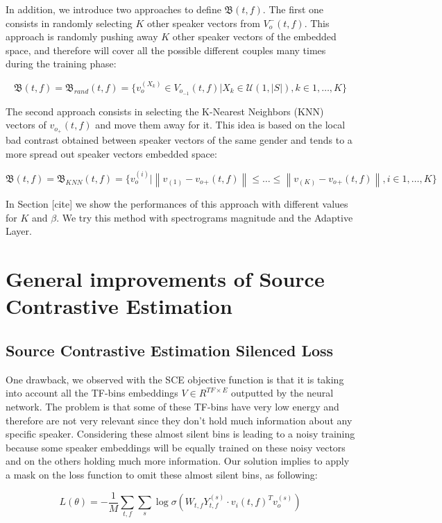 \documentclass[master,final,11pt]{iscs-thesis}
\newcommand{\norm}[1]{\left\lVert#1\right\rVert}
\begin{document}
In addition, we introduce two approaches to define $\mathfrak{B}(t,f)$. The first one consists in randomly selecting $K$ other speaker vectors from $V_o^-(t,f)$. This approach is randomly pushing away $K$ other speaker vectors of the embedded space, and therefore will cover all the possible different couples many times during the training phase:

\[\mathfrak{B}(t,f) = \mathfrak{B}_{rand}(t,f) = \{v_o^{(X_k)} \in V_{o_{-1}}(t,f) | X_k \in \mathcal{U}(1,|S|), k \in 1, \dotsc,K\} \]

The second approach consists in selecting the K-Nearest Neighbors (KNN) vectors of $v_{o_{+}}(t,f)$ and move them away for it. This idea is based on the local bad contrast obtained between speaker vectors of the same gender and tends to a more spread out speaker vectors embedded space:


\[\mathfrak{B}(t,f) = \mathfrak{B}_{KNN}(t,f) = \{v_o^{(i)} | \norm{v_{{(1)}}-v_o{_{+}}(t,f)} \leq \dots \leq \norm{v_{{(K)}}-v_o{_{+}}(t,f)}, i \in 1, \dotsc,K\}\]

In Section [cite] we show the performances of this approach with different values for $K$ and $\beta$. We try this method with spectrograms magnitude and the Adaptive Layer.


\section{General improvements of Source Contrastive Estimation}

\subsection{Source Contrastive Estimation Silenced Loss}

One drawback, we observed with the SCE objective function is that it is taking into account all the TF-bins embeddings $V \in R^{TF\times E}$ outputted by the neural network. The problem is that some of these TF-bins have very low energy and therefore are not very relevant since they don't hold much information about any specific speaker. Considering these almost silent bins is leading to a noisy training because some speaker embeddings will be equally trained on these noisy vectors and on the others holding much more information. Our solution implies to apply a mask on the loss function to omit these almost silent bins, as following:

\[L(\theta) = - \frac{1}{M} \sum_{t,f} \sum_{s} \log \sigma(W_{t,f}Y_{t,f}^{(s)}  \cdot v_i(t,f)^{T} v_o^{(s)})\]
\end{document}
